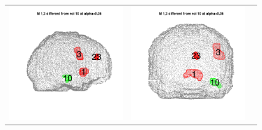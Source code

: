 \documentclass[12pt]{article}
\begin{document}
\begin{figure}[h]
\begin{tabular}{ccc}
\includegraphics[scale = 0.24]{../a7plots/d_3r_10_view1.png} & 
\includegraphics[scale = 0.24]{../a7plots/d_3r_10_view2.png} & 

\end{tabular}
\end{figure}
\end{document}
